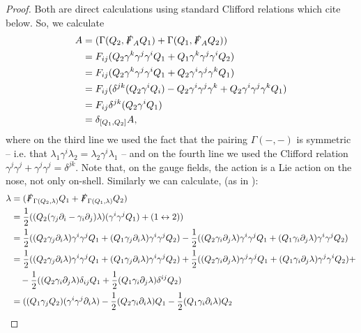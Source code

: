 \documentclass[10pt, oneside]{article}
\begin{document}
\begin{proof}
Both are direct calculations using standard Clifford relations which cite below.
So, we calculate
\begin{align*}
[\delta_{Q_1}, \delta_{Q_2}] A &= (\Gamma(Q_2,\sd F_A Q_1) + \Gamma(Q_1,\sd F_A Q_2)) \\
&=  F_{ij}(Q_2 \gamma^k \gamma^j \gamma^i Q_1 + Q_1 \gamma^k \gamma^j \gamma^i Q_2) \\
&=  F_{ij}(Q_2 \gamma^k \gamma^j \gamma^i Q_1 + Q_2 \gamma^i \gamma^j \gamma^k Q_1)\\
&= F_{ij}(\delta^{jk}(Q_2\gamma^i Q_i) - Q_2 \gamma^i \gamma^j \gamma^k + Q_2 \gamma^i \gamma^j \gamma^k Q_1)\\
&=  F_{ij}\delta^{jk}(Q_2 \gamma^i Q_1) \\
&= \delta_{[Q_1, Q_2]} A,
\end{align*}
where on the third line we used the fact that the pairing $\Gamma(-,-)$ is symmetric -- i.e. that $\lambda_1 \gamma^i \lambda_2 = \lambda_2 \gamma^i \lambda_1$ -- and on the fourth line we used the Clifford relation $\gamma^j\gamma^j+\gamma^j\gamma^j = \delta^{jk}$.  Note that, on the gauge fields, the action is a Lie action on the nose, not only on-shell.  Similarly we can calculate, (as in \cite{Guillen}):
\begin{align*}
[\delta_{Q_1}, \delta_{Q_2}] \lambda &= (\sd F_{\Gamma(Q_2, \lambda)} Q_1 + \sd F_{\Gamma(Q_1,\lambda)} Q_2) \\
&= \frac 12((Q_2 (\gamma_j \dd_i - \gamma_i \dd_j) \lambda) (\gamma^i \gamma^j Q_1) + (1 \leftrightarrow 2)) \\
&= \frac 12((Q_2 \gamma_j \dd_i \lambda) \gamma^i \gamma^j Q_1 + (Q_1 \gamma_j \dd_i \lambda) \gamma^i \gamma^j Q_2) - \frac 12((Q_2 \gamma_i \dd_j \lambda) \gamma^i \gamma^j Q_1 + (Q_1 \gamma_i \dd_j \lambda) \gamma^i \gamma^j Q_2) \\
&= \frac 12((Q_2 \gamma_j \dd_i \lambda) \gamma^i \gamma^j Q_1 + (Q_1 \gamma_j \dd_i \lambda) \gamma^i \gamma^j Q_2) + \frac 12((Q_2 \gamma_i \dd_j \lambda) \gamma^j \gamma^j Q_1 + (Q_1 \gamma_i \dd_j \lambda) \gamma^j \gamma^i Q_2) + \\
&\quad - \frac 12((Q_2 \gamma_i \dd_j \lambda) \delta_{ij} Q_1 + \frac 12(Q_1 \gamma_i \dd_j \lambda) \delta^{ij} Q_2) \\
&= ((Q_1 \gamma_j Q_2) (\gamma^i \gamma^j \dd_i \lambda) - \frac 12(Q_2 \gamma_i \dd_i \lambda)Q_1 - \frac 12(Q_1 \gamma_i \dd_i \lambda)Q_2

\end{align*}
\end{proof}
\end{document}

